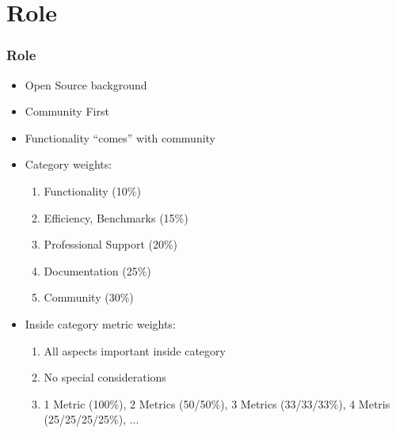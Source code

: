 \section{Role}

\begin{frame}[allowframebreaks]
\frametitle{Role}
\begin{itemize}\itemsep0pt
\item{Open Source background}
\item{Community First}
\item{Functionality ``comes'' with community}
\item{Category weights:}
\begin{enumerate}
	\item Functionality (10\%)
	\item Efficiency, Benchmarks (15\%)
	\item Professional Support (20\%)
	\item Documentation (25\%)
        \item Community (30\%)
\end{enumerate}
\item{Inside category metric weights}:
\begin{enumerate}
	\item All aspects important inside category
	\item No special considerations
        \item 1 Metric (100\%), 2 Metrics (50/50\%), 3
          Metrics (33/33/33\%), 4 Metris (25/25/25/25\%), ...
\end{enumerate}
\end{itemize}

\end{frame}
